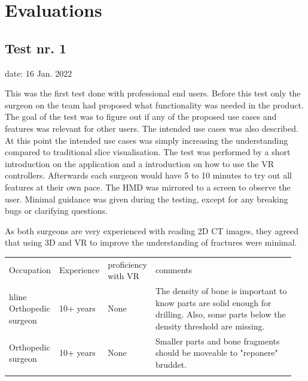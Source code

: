 \documentclass[a4paper]{report}
\begin{document}
\section{Evaluations}


\subsection{Test nr. 1}
date: 16 Jan. 2022

This was the first test done with professional end users. Before this test only the surgeon on the team had proposed what functionality was needed in the product.
The goal of the test was to figure out if any of the proposed use cases and features was relevant for other users. 
The intended use cases was also described. At this point the intended use cases was simply increasing the understanding compared to traditional slice visualisation.
The test was performed by a short introduction on the application and a introduction on how to use the VR controllers. Afterwards each surgeon would have 5 to 10 minutes to try out all features at their own pace. The HMD was mirrored to a screen to observe the user. Minimal guidance was given during the testing, except for any breaking bugs or clarifying questions.

As both surgeons are very experienced with reading 2D CT images, they agreed that using 3D and VR to improve the understanding of fractures were minimal.

\begin{table}[ht]
\begin{tabular}{p{0.15\linewidth} |p{0.15\linewidth} |p{0.15\linewidth} | p{0.5\linewidth}}
Occupation         & Experience & proficiency with VR & comments                                                                                                                                \\hline
Orthopedic surgeon & 10+ years  & None                & The density of bone is important to know parts are solid enough for drilling. Also, some parts below the density threshold are missing. \\
Orthopedic surgeon & 10+ years  & None                & Smaller parts and bone fragments should be moveable to "reponere" bruddet.                                                              \\
                   &            &                     &
\end{tabular}
\end{table}
\end{document}

